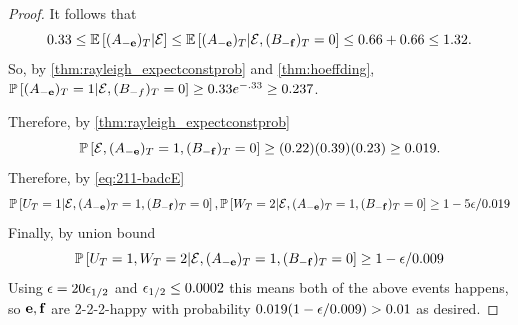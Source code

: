 \begin{proof}
It follows that
$$ 0.33\leq {\mathbb{E}}\left[(A_{-{\bf e}})_T |{\cal E}\right]\leq {\mathbb{E}}\left[(A_{-{\bf e}})_T | {\cal E},(B_{-{\bf f}})_T=0\right] \leq 0.66 +0.66\leq 1.32.  $$
So, by \cref{thm:rayleigh_expectconstprob} and \cref{thm:hoeffding}, ${\mathbb{P}}\left[(A_{-{\bf e}})_T=1 | {\cal E}, (B_{-f})_T=0\right]\geq 0.33e^{-.33}\geq 0.237$.


Therefore, by \cref{thm:rayleigh_expectconstprob}
$$ {\mathbb{P}}\left[{\cal E},(A_{-{\bf e}})_T=1,(B_{-{\bf f}})_T=0\right] \geq (0.22)(0.39)(0.23)\geq  0.019.$$
Therefore, by  \eqref{eq:211-badcE}
$$ {\mathbb{P}}\left[U_T=1 | {\cal E},(A_{-{\bf e}})_T=1,(B_{-{\bf f}})_T=0\right], {\mathbb{P}}\left[W_T=2 | {\cal E},(A_{-{\bf e}})_T=1,(B_{-{\bf f}})_T=0\right]\geq 1-5{\epsilon}/0.019$$
Finally, by union bound 
$$ {\mathbb{P}}\left[U_T=1, W_T=2 | {\cal E},(A_{-{\bf e}})_T=1,(B_{-{\bf f}})_T=0\right]\geq 1-{\epsilon}/0.009$$
Using ${\epsilon}=20{\epsilon}_{1/2}$ and ${\epsilon}_{1/2}\leq 0.0002$ this means both of the above events happens, so  ${\bf e},{\bf f}$ are 2-2-2-happy with probability $0.019(1-{\epsilon}/0.009) > 0.01$ as desired.
\end{proof}
